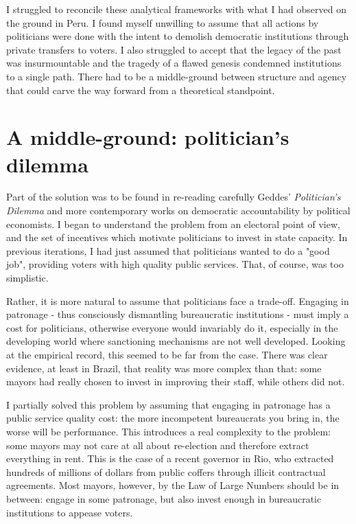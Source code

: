 \documentclass[12pt,a4paper]{article}
\begin{document}
I struggled to reconcile these analytical frameworks with what I had observed on the ground in Peru. I found myself unwilling to assume that all actions by politicians were done with the intent to demolish democratic institutions through private transfers to voters. I also struggled to accept that the legacy of the past was insurmountable and the tragedy of a flawed genesis condemned institutions to a single path. There had to be a middle-ground between structure and agency that could carve the way forward from a theoretical standpoint.

\section{A middle-ground: politician's dilemma}

Part of the solution was to be found in re-reading carefully Geddes' \textit{Politician's Dilemma} and more contemporary works on democratic accountability by political economists. I began to understand the problem from an electoral point of view, and the set of incentives which motivate politicians to invest in state capacity. In previous iterations, I had just assumed that politicians wanted to do a "good job", providing voters with high quality public services. That, of course, was too simplistic.

Rather, it is more natural to assume that politicians face a trade-off. Engaging in patronage - thus consciously dismantling bureaucratic institutions - must imply a cost for politicians, otherwise everyone would invariably do it, especially in the developing world where sanctioning mechanisms are not well developed. Looking at the empirical record, this seemed to be far from the case. There was clear evidence, at least in Brazil, that reality was more complex than that: some mayors had really chosen to invest in improving their staff, while others did not.

I partially solved this problem by assuming that engaging in patronage has a public service quality cost: the more incompetent bureaucrats you bring in, the worse will be performance. This introduces a real complexity to the problem: some mayors may not care at all about re-election and therefore extract everything in rent. This is the case of a recent governor in Rio, who extracted hundreds of millions of dollars from public coffers through illicit contractual agreements. Most mayors, however, by the Law of Large Numbers should be in between: engage in some patronage, but also invest enough in bureaucratic institutions to appease voters.
\end{document}
